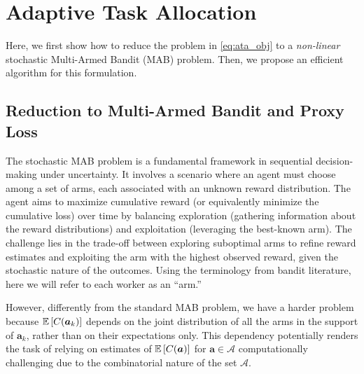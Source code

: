 \section{Adaptive Task Allocation}
\label{section:ata}

Here, we first show how to reduce the problem in \eqref{eq:ata_obj} to a \emph{non-linear} stochastic Multi-Armed Bandit (MAB) problem. Then, we propose an efficient algorithm for this formulation.

\subsection{Reduction to Multi-Armed Bandit and Proxy Loss}
\label{sec:reduction}
The stochastic MAB problem is a fundamental framework in sequential decision-making under uncertainty.
It involves a scenario where an agent must choose among a set of arms, each associated with an unknown reward distribution.
The agent aims to maximize cumulative reward (or equivalently minimize the cumulative loss) over time by balancing exploration (gathering information about the reward distributions) and exploitation (leveraging the best-known arm).
The challenge lies in the trade-off between exploring suboptimal arms to refine reward estimates and exploiting the arm with the highest observed reward, given the stochastic nature of the outcomes.
Using the terminology from bandit literature, here we will refer to each worker as an ``arm.''

However, differently from the standard MAB problem, we have a harder problem because $\mathbb{E}\left[C(\bm{a}_k)\right]$ depends on the joint distribution of all the arms in the support of $\bm{a}_k$, rather than on their expectations only.
This dependency potentially renders the task of relying on estimates of $\mathbb{E}\left[C(\bm{a})\right]$ for $\bm{a} \in \mathcal{A}$ computationally challenging due to the combinatorial nature of the set $\mathcal{A}$.

